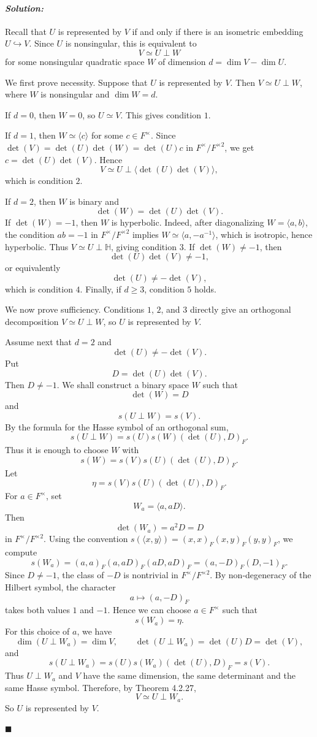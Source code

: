 \documentclass[12pt, a4paper]{article}
\newenvironment{solution}
  {\paragraph{\textit{Solution:}}\par\medskip}
  {\hfill$\blacksquare$\vspace{0.1cm}}
\begin{document}
\begin{solution}
Recall that \(U\) is represented by \(V\) if and only if there is an isometric
embedding \(U\hookrightarrow V\). Since \(U\) is nonsingular, this is equivalent
to
\[
V\simeq U\perp W
\]
for some nonsingular quadratic space \(W\) of dimension
\(d=\dim V-\dim U\).

We first prove necessity. Suppose that \(U\) is represented by \(V\). Then
\(V\simeq U\perp W\), where \(W\) is nonsingular and \(\dim W=d\).

If \(d=0\), then \(W=0\), so \(U\simeq V\). This gives condition \(1\).

If \(d=1\), then \(W\simeq \langle c\rangle\) for some \(c\in F^\times\). Since
\(\det(V)=\det(U)\det(W)=\det(U)c\) in \(F^\times/F^{\times 2}\), we get
\(c=\det(U)\det(V)\). Hence
\[
V\simeq U\perp \langle \det(U)\det(V)\rangle,
\]
which is condition \(2\).

If \(d=2\), then \(W\) is binary and
\[
\det(W)=\det(U)\det(V).
\]
If \(\det(W)=-1\), then \(W\) is hyperbolic. Indeed, after diagonalizing
\(W=\langle a,b\rangle\), the condition \(ab=-1\) in
\(F^\times/F^{\times 2}\) implies \(W\simeq \langle a,-a^{-1}\rangle\), which
is isotropic, hence hyperbolic. Thus \(V\simeq U\perp \mathbb H\), giving
condition \(3\). If \(\det(W)\neq -1\), then
\[
\det(U)\det(V)\neq -1,
\]
or equivalently
\[
\det(U)\neq -\det(V),
\]
which is condition \(4\). Finally, if \(d\ge 3\), condition \(5\) holds.

We now prove sufficiency. Conditions \(1\), \(2\), and \(3\) directly give an
orthogonal decomposition \(V\simeq U\perp W\), so \(U\) is represented by \(V\).

Assume next that \(d=2\) and
\[
\det(U)\neq -\det(V).
\]
Put
\[
D=\det(U)\det(V).
\]
Then \(D\neq -1\). We shall construct a binary space \(W\) such that
\[
\det(W)=D
\]
and
\[
s(U\perp W)=s(V).
\]
By the formula for the Hasse symbol of an orthogonal sum,
\[
s(U\perp W)=s(U)s(W)(\det(U),D)_F.
\]
Thus it is enough to choose \(W\) with
\[
s(W)=s(V)s(U)(\det(U),D)_F.
\]
Let
\[
\eta=s(V)s(U)(\det(U),D)_F.
\]
For \(a\in F^\times\), set
\[
W_a=\langle a,aD\rangle.
\]
Then
\[
\det(W_a)=a^2D=D
\]
in \(F^\times/F^{\times 2}\). Using the convention
\(s(\langle x,y\rangle)=(x,x)_F(x,y)_F(y,y)_F\), we compute
\[
s(W_a)
=(a,a)_F(a,aD)_F(aD,aD)_F
=(a,-D)_F(D,-1)_F.
\]
Since \(D\neq -1\), the class of \(-D\) is nontrivial in
\(F^\times/F^{\times 2}\). By non-degeneracy of the Hilbert symbol, the
character
\[
a\longmapsto (a,-D)_F
\]
takes both values \(1\) and \(-1\). Hence we can choose \(a\in F^\times\) such
that
\[
s(W_a)=\eta.
\]
For this choice of \(a\), we have
\[
\dim(U\perp W_a)=\dim V,\qquad
\det(U\perp W_a)=\det(U)D=\det(V),
\]
and
\[
s(U\perp W_a)
=s(U)s(W_a)(\det(U),D)_F
=s(V).
\]
Thus \(U\perp W_a\) and \(V\) have the same dimension, the same determinant
and the same Hasse symbol. Therefore, by Theorem 4.2.27,
\[
V\simeq U\perp W_a.
\]
So \(U\) is represented by \(V\).


\end{solution}
\end{document}
